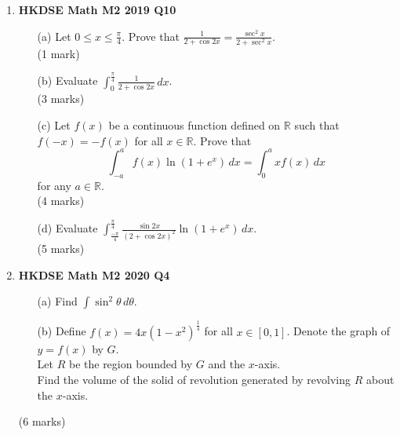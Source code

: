 \documentclass{report}
\begin{document}
\begin{enumerate}
	\item \textbf{HKDSE Math M2 2019 Q10}
	\begin{enumerate}
		\item [(a)] Let $0 \leq x \leq \displaystyle\frac{\pi}{4}$. Prove that $\displaystyle\frac{1}{2+\cos{2x}} = \frac{\sec^2{x}}{2+\sec^2{x}}$. \\(1 mark) 
		\item [(b)] Evaluate $\displaystyle \int_{0}^{ \tfrac{\pi}{4}} \frac{1}{2+\cos{2x}}\,dx$. \\(3 marks)
		\item [(c)] Let $f(x)$ be a continuous function defined on $\mathbb{R}$ such that $f(-x) = -f(x)$ for all $x \in \mathbb{R}$. Prove that $$\displaystyle\int_{-a}^{a} f(x)\ln{(1+e^x)}\,dx = \int_{0}^{a} xf(x)\,dx$$ for any $a \in \mathbb{R}  $. \\(4 marks)
		\item [(d)] Evaluate $\displaystyle \int_{\tfrac{-\pi}{4}}^{\tfrac{\pi}{4}}  \frac{\sin{2x}}{(2+\cos{2x})^2}\ln(1 + e^x)\,dx$. \\(5 marks)
	\end{enumerate}

	\item \textbf{HKDSE Math M2 2020 Q4}
	\begin{enumerate}
		\item [(a)]Find $\displaystyle \int \sin^2{\theta} \,d\theta$. 
		\item [(b)]Define $\displaystyle f(x) = 4x(1-x^2)^{\frac{1}{4}}$ for all $x \in [0,1]$. Denote the graph of $y = f(x) $ by $G$. \\
		Let $R$ be the region bounded by $G$ and the $x$-axis. \\
		Find the volume of the solid of revolution generated by revolving $R$ about the $x$-axis.
	\end{enumerate}
	(6 marks)


\end{enumerate}
\end{document}

